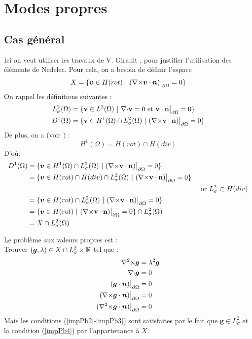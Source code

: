 \chapter{Modes propres}
\section{Cas général}
Ici on veut utiliser les travaux de V. Girault \cite{girault90-1}, pour justifier l'utilisation des éléments de Nedelec. Pour cela, on a besoin de définir l'espace \[X = \{\bm{v}\in H(rot)\ |\ (\rot\bm{v}\cdot\bm{n})\restr=0 \}\]
On rappel les définitions suivantes :
\begin{align*}
L^2_\sigma(\Omega) &= \{\mathbf{v} \in L^2(\Omega)\ |\ \div \mathbf{v} = 0\text{ et }\mathbf{v}\cdot \mathbf{n}\restr = 0 \}\\
D^1(\Omega) &= \{\mathbf{v} \in H^1(\Omega)\cap L^2_\sigma(\Omega)\ |\ (\rot \mathbf{v}\cdot \mathbf{n})\restr = 0  \}
\end{align*}
De plus, on a (voir \cite{Girault79}) :
\[ H^1(\Omega)=H(rot)\cap H(div) \]
D'où:
\begin{align*}
D^1(\Omega) &= \{\bm{v}\in H^1(\Omega)\cap L^2_\sigma(\Omega)\ |\ (\rot \mathbf{v}\cdot \mathbf{n})\restr = 0  \}&\\
&=\{\bm{v}\in H(rot)\cap H(div)\cap L^2_\sigma(\Omega)\ |\ (\rot \mathbf{v}\cdot \mathbf{n})\restr = 0  \}&\\
&&\text{ or }L^2_\sigma\subset H(div)\\
&=\{\bm{v}\in H(rot)\cap L^2_\sigma(\Omega)\ |\ (\rot \mathbf{v}\cdot \mathbf{n})\restr = 0  \}&\\
&=\{\bm{v}\in H(rot)\ |\ (\rot \mathbf{v}\cdot \mathbf{n})\restr = 0  \}\cap L^2_\sigma(\Omega)&\\
&=X\cap L^2_\sigma(\Omega)&
\end{align*}

Le problème aux valeurs propres est :\\
Trouver $(\bm{g},\lambda)\in X\cap L^2_\sigma\times{\mathbb{R}}$ tel que :
\begin{align}
{\nabla^2\times}\bm{g}&=\lambda^2\bm{g} \label{impPb1}\\
{\nabla\cdot}\bm{g}&=0 \label{impPb2}\\
(\bm{g}\cdot\bm{n}){\big\rvert_{\partial\Omega}}&=0 \label{impPb3}\\
({\nabla\times}\bm{g}\cdot\bm{n}){\big\rvert_{\partial\Omega}}&=0 \label{impPb4}\\
({\nabla^2\times}\bm{g}\cdot\bm{n}){\big\rvert_{\partial\Omega}}&=0 \label{impPb5}
\end{align}
Mais les conditions (\ref{impPb2}-\ref{impPb3}) sont satisfaites par le fait que $\bm{g}\in L^2_\sigma$ et la condition (\ref{impPb4}) par l'appartenance à $X$.\\

